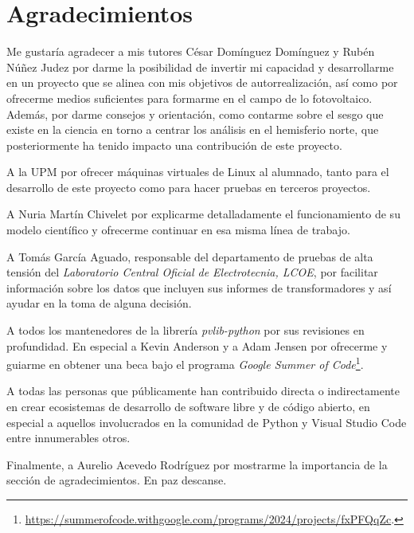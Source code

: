 \chapter*{Agradecimientos} \label{chp:agrad}

Me gustaría agradecer a mis tutores César Domínguez Domínguez y Rubén Núñez Judez por darme la posibilidad de invertir mi capacidad y desarrollarme en un proyecto que se alinea con mis objetivos de autorrealización, así como por ofrecerme medios suficientes para formarme en el campo de lo fotovoltaico. Además, por darme consejos y orientación, como contarme sobre el sesgo que existe en la ciencia en torno a centrar los análisis en el hemisferio norte, que posteriormente ha tenido impacto una contribución de este proyecto.

A la UPM por ofrecer máquinas virtuales de Linux al alumnado, tanto para el desarrollo de este proyecto como para hacer pruebas en terceros proyectos.

A Nuria Martín Chivelet por explicarme detalladamente el funcionamiento de su modelo científico y ofrecerme continuar en esa misma línea de trabajo.

A Tomás García Aguado, responsable del departamento de pruebas de alta tensión del \textit{Laboratorio Central Oficial de Electrotecnia, LCOE}, por facilitar información sobre los datos que incluyen sus informes de transformadores y así ayudar en la toma de alguna decisión.

A todos los mantenedores de la librería \textit{pvlib-python} por sus revisiones en profundidad. En especial a Kevin Anderson y a Adam Jensen por ofrecerme y guiarme en obtener una beca bajo el programa \textit{Google Summer of Code}\footnote{\url{https://summerofcode.withgoogle.com/programs/2024/projects/fxPFQqZc}.}.

A todas las personas que públicamente han contribuido directa o indirectamente en crear ecosistemas de desarrollo de software libre y de código abierto, en especial a aquellos involucrados en la comunidad de Python y Visual Studio Code entre innumerables otros.

Finalmente, a Aurelio Acevedo Rodríguez por mostrarme la importancia de la sección de agradecimientos. En paz descanse.
